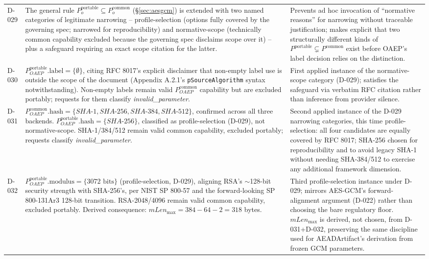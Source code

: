 \documentclass[11pt,a4paper]{article}
\begin{document}
\begin{longtable}{@{}L{0.28\textwidth}L{0.34\textwidth}L{0.30\textwidth}@{}}
D-029 & The general rule $P_o^{\text{portable}} \subseteq P_o^{\text{common}}$ (\S\ref{sec:aesgcm}) is extended with two named categories of legitimate narrowing -- profile-selection (options fully covered by the governing spec; narrowed for reproducibility) and normative-scope (technically common capability excluded because the governing spec disclaims scope over it) -- plus a safeguard requiring an exact scope citation for the latter. & Prevents ad hoc invocation of ``normative reasons'' for narrowing without traceable justification; makes explicit that two structurally different kinds of $P^{\text{portable}} \subsetneq P^{\text{common}}$ exist before OAEP's label decision relies on the distinction.\\
D-030 & $P_{OAEP}^{\text{portable}}.\text{label} = \{\emptyset\}$, citing RFC 8017's explicit disclaimer that non-empty label use is outside the scope of the document (Appendix A.2.1's \texttt{pSourceAlgorithm} syntax notwithstanding). Non-empty labels remain valid $P_{OAEP}^{\text{common}}$ capability but are excluded portably; requests for them classify \emph{invalid\_parameter}. & First applied instance of the normative-scope category (D-029); satisfies the safeguard via verbatim RFC citation rather than inference from provider silence.\\
D-031 & $P_{OAEP}^{\text{common}}.\text{hash} = \{SHA\text{-}1, SHA\text{-}256, SHA\text{-}384, SHA\text{-}512\}$, confirmed across all three backends. $P_{OAEP}^{\text{portable}}.\text{hash} = \{SHA\text{-}256\}$, classified as profile-selection (D-029), not normative-scope. SHA-1/384/512 remain valid common capability, excluded portably; requests classify \emph{invalid\_parameter}. & Second applied instance of the D-029 narrowing categories, this time profile-selection: all four candidates are equally covered by RFC 8017; SHA-256 chosen for reproducibility and to avoid legacy SHA-1 without needing SHA-384/512 to exercise any additional framework dimension.\\
D-032 & $P_{OAEP}^{\text{portable}}.\text{modulus} = \{3072 \text{ bits}\}$ (profile-selection, D-029), aligning RSA's $\sim$128-bit security strength with SHA-256's, per NIST SP 800-57 and the forward-looking SP 800-131Ar3 128-bit transition. RSA-2048/4096 remain valid common capability, excluded portably. Derived consequence: $mLen_{\max} = 384 - 64 - 2 = 318$ bytes. & Third profile-selection instance under D-029; mirrors AES-GCM's forward-alignment argument (D-022) rather than choosing the bare regulatory floor. $mLen_{\max}$ is derived, not chosen, from D-031+D-032, preserving the same discipline used for AEADArtifact's derivation from frozen GCM parameters.\\

\end{longtable}
\end{document}
